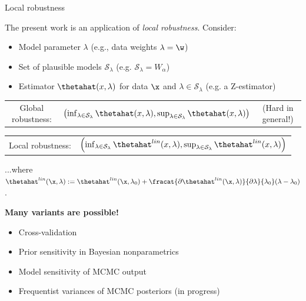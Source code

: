 \begin{frame}{Local robustness}

The present work is an application of {\em local robustness}.  Consider:
%
\begin{itemize}
%
\item Model parameter $\lambda$  (e.g., data weights $\lambda = \w$)
\item Set of plausible models $\mathcal{S}_\lambda$
    (e.g. $\mathcal{S}_\lambda = W_\alpha$)
\item Estimator $\thetahat(x, \lambda)$ for data $\x$ and
    $\lambda \in \mathcal{S}_\lambda$
    (e.g. a Z-estimator)
%
\end{itemize}
%

\hrulefill

\begin{tabular}{ccc}
    Global robustness:   &
%
$
\left(
\inf_{\lambda \in \mathcal{S}_\lambda} \thetahat(x, \lambda),
\sup_{\lambda \in \mathcal{S}_\lambda} \thetahat(x, \lambda)
\right)
$
& (Hard in general!)
\end{tabular}


\hrulefill

\begin{tabular}{cc}
Local robustness:
&
$
\left(
\inf_{\lambda \in \mathcal{S}_\lambda} \thetahat^{lin}(x, \lambda),
\sup_{\lambda \in \mathcal{S}_\lambda} \thetahat^{lin}(x, \lambda)
\right)
$
%
\end{tabular}

...where $\thetahat^{lin}(\x, \lambda) :=
\thetahat^{lin}(\x, \lambda_0) +
    \fracat{\partial \thetahat^{lin}(\x, \lambda)}{\partial \lambda}{\lambda_0}
        (\lambda  - \lambda_0)$.

\hrulefill

\textbf{Many variants are possible!}

\begin{itemize}
    \item Cross-validation \parencite{giordano2019swiss}
    \item Prior sensitivity in Bayesian nonparametrics \parencite{giordano2021bnp}
    \item Model sensitivity of MCMC output \parencite{giordano2018covariances}
    \item Frequentist variances of MCMC posteriors (in progress)
\end{itemize}


\end{frame}
